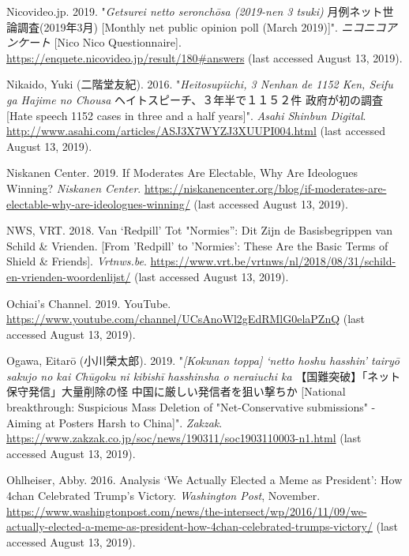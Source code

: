 \documentclass[10pt,british,A4paper,oneside]{memoir}
\begin{document}
\hypertarget{ref-nicovideo.jp_monthly_2019}{}
Nicovideo.jp. 2019. "\emph{Getsurei netto seronchōsa (2019-nen 3 tsuki)} 月例ネット世論調査(2019年3月) [Monthly net public opinion poll (March 2019)]".
\emph{ニコニコアンケート} [Nico Nico Questionnaire].
\url{https://enquete.nicovideo.jp/result/180\#answers} (last accessed August 13, 2019).

\hypertarget{ref-nikaido_eng:_2016}{}
Nikaido, Yuki (二階堂友紀). 2016. "\emph{Heitosupiichi, 3 Nenhan de 1152 Ken, Seifu ga Hajime no Chousa} ヘイトスピーチ、３年半で１１５２件 政府が初の調査 [Hate speech 1152 cases in three and a half years]". \emph{Asahi Shinbun Digital}.
\url{http://www.asahi.com/articles/ASJ3X7WYZJ3XUUPI004.html} (last accessed August 13, 2019).

\hypertarget{ref-niskanen_center_if_2019}{}
Niskanen Center. 2019. If Moderates Are Electable, Why Are Ideologues
Winning? \emph{Niskanen Center}.
\url{https://niskanencenter.org/blog/if-moderates-are-electable-why-are-ideologues-winning/} (last accessed August 13, 2019).

\hypertarget{ref-nws_van_2018}{}
NWS, VRT. 2018. Van `Redpill' Tot "Normies'': Dit Zijn de Basisbegrippen
van Schild \& Vrienden. [From 'Redpill' to 'Normies': These Are the Basic Terms of Shield \& Friends]. \emph{Vrtnws.be}.
\url{https://www.vrt.be/vrtnws/nl/2018/08/31/schild-en-vrienden-woordenlijst/} (last accessed August 13, 2019).

\hypertarget{ref-noauthor_ochiais_nodate}{}
Ochiai's Channel. 2019. YouTube.
\url{https://www.youtube.com/channel/UCsAnoWl2gEdRMlG0elaPZnQ} (last accessed August 13, 2019).

\hypertarget{ref-ogawa_eng._2019}{}
Ogawa, Eitarō (小川榮太郎). 2019. "\emph{[Kokunan toppa] `netto hoshu hasshin' tairyō sakujo no kai Chūgoku ni kibishī hasshinsha o neraiuchi ka} 【国難突破】「ネット保守発信」大量削除の怪 中国に厳しい発信者を狙い撃ちか [National breakthrough: Suspicious Mass Deletion of "Net-Conservative submissions" - Aiming at Posters Harsh to China]". \emph{Zakzak}.
\url{https://www.zakzak.co.jp/soc/news/190311/soc1903110003-n1.html} (last accessed August 13, 2019).

\hypertarget{ref-ohlheiser_analysis_2016}{}
Ohlheiser, Abby. 2016. Analysis `We Actually Elected a Meme as
President': How 4chan Celebrated Trump's Victory. \emph{Washington
Post}, November.
\url{https://www.washingtonpost.com/news/the-intersect/wp/2016/11/09/we-actually-elected-a-meme-as-president-how-4chan-celebrated-trumps-victory/} (last accessed August 13, 2019).
\end{document}
